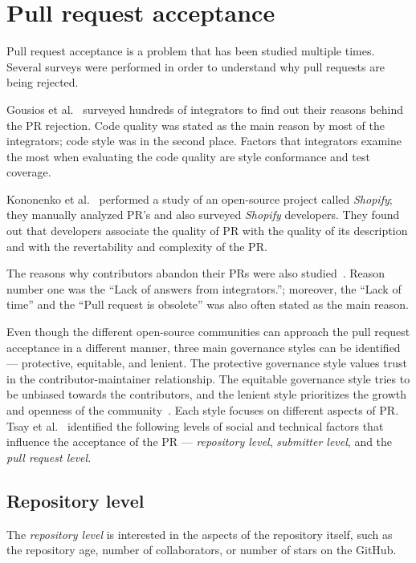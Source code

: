 \documentclass[digital,oneside,oldtable,nolof,nolot,nocover]{fithesis4}
\begin{document}
\chapter{Pull request acceptance}
\label{sec:org1367f72}
Pull request acceptance is a problem that has been studied multiple
times. Several surveys were performed in order to understand why pull requests
are being rejected.

Gousios et al.~\cite{integrator} surveyed hundreds of integrators to find out
their reasons behind the PR rejection. Code quality was stated as the main
reason by most of the integrators; code style was in the second place.
Factors that integrators examine the most when evaluating the code quality are
style conformance and test coverage.

Kononenko et al.~\cite{shopify} performed a study of an open-source project
called \emph{Shopify}; they manually analyzed PR's and also surveyed \emph{Shopify}
developers. They found out that developers associate the quality of PR with
the quality of its description and with the revertability and complexity of
the PR.

The reasons why contributors abandon their PRs were also
studied~\cite{abandonment}. Reason number one was the ``Lack of answers from
integrators.''; moreover, the ``Lack of time'' and the ``Pull request is
obsolete'' was also often stated as the main reason.

Even though the different open-source communities can approach the pull request acceptance in
a different manner, three main governance styles can be
identified --- protective, equitable, and lenient. The protective governance style
values trust in the contributor-maintainer relationship. The equitable
governance style tries to be unbiased towards the contributors, and the
lenient style prioritizes the growth and openness of the community~\cite{foss}.
Each style focuses on different aspects of PR. Tsay et al.~\cite{social}
identified the following levels of social and technical factors that influence
the acceptance of the PR --- \emph{repository level}, \emph{submitter level}, and the
\emph{pull request level}.
\section{Repository level}
\label{sec:orge757c39}
The \emph{repository level} is interested in the aspects of the repository itself,
such as the repository age, number of collaborators, or number of stars on
the GitHub.
\end{document}
